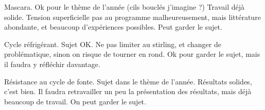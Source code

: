 Mascara. Ok pour le thème de l'année (cils bouclés j'imagine ?) Travail déjà solide. Tension superficielle pas au programme malheureusement, mais littérature abondante, et beaucoup d'expériences possibles. Peut garder le sujet.

Cycle réfrigérant. Sujet OK. Ne pas limiter au stirling, et changer de problématique, sinon on risque de tourner en rond. Ok pour garder le sujet, mais il faudra y réfléchir davantage.

Résistance au cycle de fonte. Sujet dans le thème de l'année. Résultats solides, c'est bien. Il faudra retravailler un peu la présentation des résultats, mais déjà beaucoup de travail. On peut garder le sujet.






